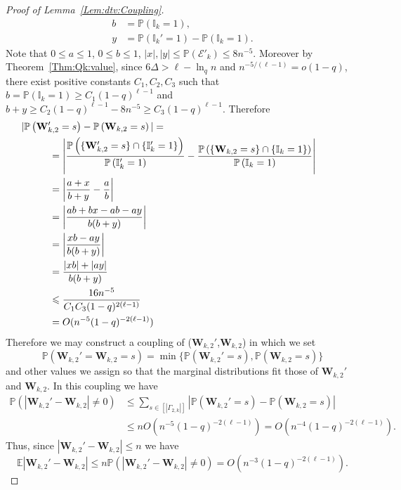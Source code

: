 \documentclass[letterpaper,11pt]{article}
\theoremstyle{definition}
\theoremstyle{remark}
\renewcommand{\le}{\leqslant}
\renewcommand{\ge}{\geqslant}
\newcommand{\bE}{\mathbb{E}}
\newcommand{\Pra}[1]{\mathbb{P}\left(#1\right)}
\newcommand{\Ind}{\mathbb{I}}
\newcommand{\cE}{\mathcal{E}}
\newcommand{\bW}{\mathbf{W}}
\begin{document}
\begin{proof}[Proof of Lemma~\ref{Lem:dtv:Coupling}]
\begin{align*}
		b&=\Pra{\Ind_k=1},\\
		y&=\Pra{\Ind_k'=1}-\Pra{\Ind_k=1}.
	\end{align*}
	Note that $0\le a\le 1$, $0\le b\le 1$, $|x|,|y|\le \Pra{\cE'_k}\le 8n^{-5}$. Moreover by Theorem~\ref{Thm:Qk:value}, since $6\Delta>\ell-\ln_qn$ and $n^{-5/(\ell-1)}=o(1-q)$, there exist positive constants $C_1,C_2,C_3$ such that $b=\Pra{\Ind_k=1}\ge C_1(1-q)^{\ell-1}$ and $b+y\ge  C_2(1-q)^{\ell-1}-8n^{-5}\ge C_3(1-q)^{\ell-1}$. Therefore
	\begin{align*}
		&\hspace{-1cm}|\Pra{\bW_{k,2}'=s}-\Pra{\bW_{k,2}=s}|=\\
		&=
		\left|
		\frac{\Pra{\{\bW'_{k,2}=s\}\cap\{\Ind'_k=1\}}}{\Pra{\Ind'_k=1}}
		-\frac{\Pra{\{\bW_{k,2}=s\}\cap\{\Ind_k=1\}}}{\Pra{\Ind_k=1}}
		\right|
		\\
		&=\left|\frac{a+x}{b+y}-\frac{a}{b}\right|\\
		&=\left|\frac{ab+bx-ab-ay}{b(b+y)}\right|\\
		&=\left|\frac{xb-ay}{b(b+y)}\right|\\
		&=\frac{|xb|+|ay|}{b(b+y)}\\
		&\le \frac{16 n^{-5}}{C_1C_3(1-q)^{2(\ell-1)}}\\
		&=O(n^{-5}(1-q)^{-2(\ell-1)})
	\end{align*}
	Therefore we may construct a coupling of ($\bW_{k,2}'$,$\bW_{k,2}$) in which we set 
	\[\Pra{\bW_{k,2}'=\bW_{k,2}=s}=\min\{\Pra{\bW_{k,2}'=s},\Pra{\bW_{k,2}=s}\}\]
	and other values we assign so that the marginal distributions fit those of $\bW_{k,2}'$ and $\bW_{k,2}$.
	In this coupling we have 
	\begin{align*}
		\Pra{|\bW_{k,2}'-\bW_{k,2}|\neq 0}&\le \sum_{s\in [|\Gamma_{2,k}|]}|\Pra{\bW_{k,2}'=s}-\Pra{\bW_{k,2}=s}|\\&\le nO(n^{-5}(1-q)^{-2(\ell-1)})=O(n^{-4}(1-q)^{-2(\ell-1)}).\end{align*}
	Thus, since $|\bW_{k,2}'-\bW_{k,2}|\le n$ we have
	\[
	\bE|\bW_{k,2}'-\bW_{k,2}|\le n \Pra{|\bW_{k,2}'-\bW_{k,2}|\neq 0}=O(n^{-3}(1-q)^{-2(\ell-1)}).
	\]
\end{proof}
\end{document}
